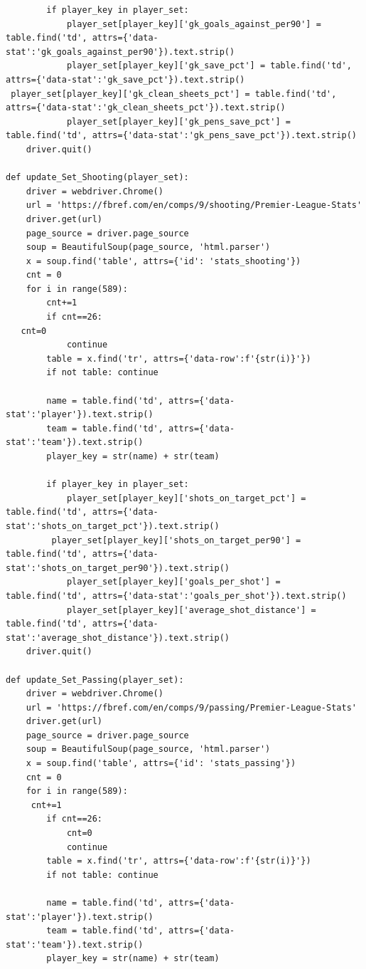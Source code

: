 \documentclass[12pt]{report}
\begin{document}
{\begin{lstlisting}
        if player_key in player_set:
            player_set[player_key]['gk_goals_against_per90'] = table.find('td', attrs={'data-stat':'gk_goals_against_per90'}).text.strip()
            player_set[player_key]['gk_save_pct'] = table.find('td', attrs={'data-stat':'gk_save_pct'}).text.strip()
 player_set[player_key]['gk_clean_sheets_pct'] = table.find('td', attrs={'data-stat':'gk_clean_sheets_pct'}).text.strip()
            player_set[player_key]['gk_pens_save_pct'] = table.find('td', attrs={'data-stat':'gk_pens_save_pct'}).text.strip()
    driver.quit()

def update_Set_Shooting(player_set):
    driver = webdriver.Chrome()
    url = 'https://fbref.com/en/comps/9/shooting/Premier-League-Stats'
    driver.get(url)
    page_source = driver.page_source
    soup = BeautifulSoup(page_source, 'html.parser')
    x = soup.find('table', attrs={'id': 'stats_shooting'})
    cnt = 0
    for i in range(589):
        cnt+=1
        if cnt==26:
   cnt=0
            continue
        table = x.find('tr', attrs={'data-row':f'{str(i)}'})
        if not table: continue

        name = table.find('td', attrs={'data-stat':'player'}).text.strip()
        team = table.find('td', attrs={'data-stat':'team'}).text.strip()
        player_key = str(name) + str(team)

        if player_key in player_set:
            player_set[player_key]['shots_on_target_pct'] = table.find('td', attrs={'data-stat':'shots_on_target_pct'}).text.strip()
         player_set[player_key]['shots_on_target_per90'] = table.find('td', attrs={'data-stat':'shots_on_target_per90'}).text.strip()
            player_set[player_key]['goals_per_shot'] = table.find('td', attrs={'data-stat':'goals_per_shot'}).text.strip()
            player_set[player_key]['average_shot_distance'] = table.find('td', attrs={'data-stat':'average_shot_distance'}).text.strip()
    driver.quit()

def update_Set_Passing(player_set):
    driver = webdriver.Chrome()
    url = 'https://fbref.com/en/comps/9/passing/Premier-League-Stats'
    driver.get(url)
    page_source = driver.page_source
    soup = BeautifulSoup(page_source, 'html.parser')
    x = soup.find('table', attrs={'id': 'stats_passing'})
    cnt = 0
    for i in range(589):
     cnt+=1
        if cnt==26:
            cnt=0
            continue
        table = x.find('tr', attrs={'data-row':f'{str(i)}'})
        if not table: continue

        name = table.find('td', attrs={'data-stat':'player'}).text.strip()
        team = table.find('td', attrs={'data-stat':'team'}).text.strip()
        player_key = str(name) + str(team)


\end{lstlisting}}
\end{document}
